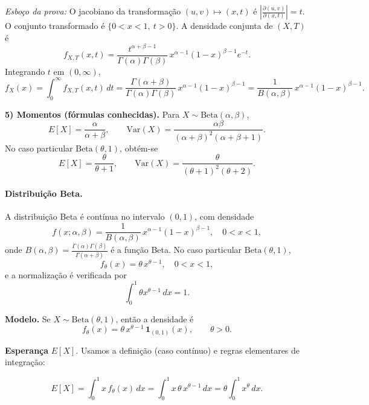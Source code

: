 \emph{Esboço da prova:} O jacobiano da transformação $(u,v)\mapsto(x,t)$ é
$\left|\frac{\partial(u,v)}{\partial(x,t)}\right|=t$.
O conjunto transformado é $\{0<x<1,\ t>0\}$. A densidade conjunta de $(X,T)$ é
\[
f_{X,T}(x,t)=\frac{t^{\alpha+\beta-1}}{\Gamma(\alpha)\Gamma(\beta)}\,
x^{\alpha-1}(1-x)^{\beta-1}e^{-t}.
\]
Integrando $t$ em $(0,\infty)$,
\[
f_X(x)=\int_0^\infty f_{X,T}(x,t)\,dt
=\frac{\Gamma(\alpha+\beta)}{\Gamma(\alpha)\Gamma(\beta)}\,
x^{\alpha-1}(1-x)^{\beta-1}
=\frac{1}{B(\alpha,\beta)}\,x^{\alpha-1}(1-x)^{\beta-1}.
\]

\textbf{5) Momentos (fórmulas conhecidas).}
Para $X\sim\mathrm{Beta}(\alpha,\beta)$,
\[
E[X]=\frac{\alpha}{\alpha+\beta},\qquad
\mathrm{Var}(X)=\frac{\alpha\beta}{(\alpha+\beta)^2(\alpha+\beta+1)}.
\]
No caso particular $\mathrm{Beta}(\theta,1)$, obtém-se
\[
E[X]=\frac{\theta}{\theta+1},
\qquad
\mathrm{Var}(X)=\frac{\theta}{(\theta+1)^2(\theta+2)}.
\]

\paragraph{Distribuição Beta.}
A distribuição Beta é contínua no intervalo $(0,1)$, com densidade
\[
f(x;\alpha,\beta)
= \frac{1}{B(\alpha,\beta)}\, x^{\alpha-1}(1-x)^{\beta-1},
\quad
0<x<1,
\]
onde $B(\alpha,\beta)=\frac{\Gamma(\alpha)\Gamma(\beta)}{\Gamma(\alpha+\beta)}$ é a função Beta.
No caso particular $\mathrm{Beta}(\theta,1)$,
\[
f_\theta(x)=\theta\,x^{\theta-1},\quad 0<x<1,
\]
e a normalização é verificada por
\[
\int_0^1 \theta x^{\theta-1}\,dx = 1.
\]


\textbf{Modelo.} Se $X\sim\mathrm{Beta}(\theta,1)$, então a densidade é
\[
f_\theta(x)=\theta\,x^{\theta-1}\,\mathbf 1_{(0,1)}(x), \qquad \theta>0.
\]

\textbf{Esperança} $E[X]$.
Usamos a definição (caso contínuo) e regras elementares de integração:

\[
E[X]=\int_0^1 x\,f_\theta(x)\,dx
=\int_0^1 x\,\theta\,x^{\theta-1}\,dx
=\theta\int_0^1 x^{\theta}\,dx.
\]

